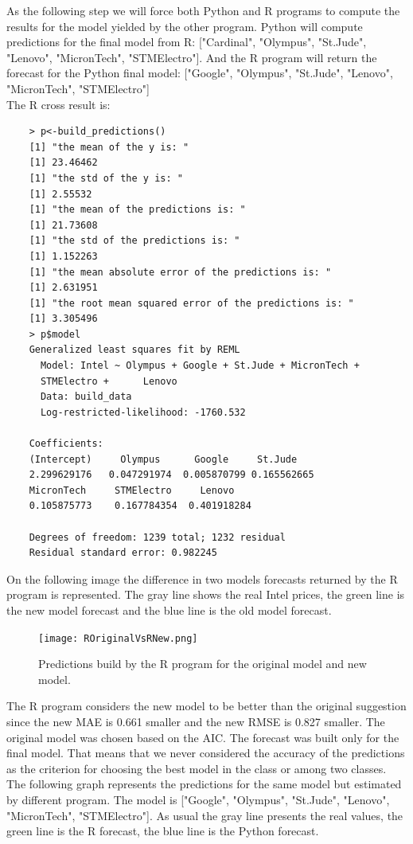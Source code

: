 \documentclass[
  twoside,
  11pt, a4paper,
  footinclude=true,
  headinclude=true,
  cleardoublepage=empty
]{scrreprt}
\begin{document}
    As the following step we will force both Python and R programs to compute the results for the model yielded by the other program. Python will compute predictions for the final model from R: ["Cardinal", "Olympus", "St.Jude", "Lenovo", "MicronTech", "STMElectro"]. And the R program will return the forecast for the Python final model: ["Google", "Olympus", "St.Jude", "Lenovo", "MicronTech", "STMElectro"]\\
    The R cross result is:
    \begin{verbatim}
    > p<-build_predictions()
    [1] "the mean of the y is: "
    [1] 23.46462
    [1] "the std of the y is: "
    [1] 2.55532
    [1] "the mean of the predictions is: "
    [1] 21.73608
    [1] "the std of the predictions is: "
    [1] 1.152263
    [1] "the mean absolute error of the predictions is: "
    [1] 2.631951
    [1] "the root mean squared error of the predictions is: "
    [1] 3.305496
    > p$model
    Generalized least squares fit by REML
      Model: Intel ~ Olympus + Google + St.Jude + MicronTech + 
      STMElectro +      Lenovo 
      Data: build_data 
      Log-restricted-likelihood: -1760.532
    
    Coefficients:
    (Intercept)     Olympus      Google     St.Jude  
    2.299629176   0.047291974  0.005870799 0.165562665
    MicronTech     STMElectro     Lenovo 
    0.105875773    0.167784354  0.401918284 
    
    Degrees of freedom: 1239 total; 1232 residual
    Residual standard error: 0.982245 
    \end{verbatim}
    On the following image the difference in two models forecasts returned by the R program is represented. The gray line shows the real Intel prices, the green line is the new model forecast and the blue line is the old model forecast.
    
    \begin{figure}[H]
        \texttt{[image: ROriginalVsRNew.png]}
        \centering
        \caption{Predictions build by the R program for the original model and new model.}
        \label{fig:ROriginalVsRNew}
    \end{figure}
    
    The R program considers the new model to be better than the original suggestion since the new MAE is 0.661 smaller and the new RMSE is 0.827 smaller. The original model was chosen based on the AIC. The forecast was built only for the final model. That means that we never considered the accuracy of the predictions as the criterion for choosing the best model in the class or among two classes.\\
    The following graph represents the predictions for the same model but estimated by different program. The model is ["Google", "Olympus", "St.Jude", "Lenovo", "MicronTech", "STMElectro"]. As usual the gray line presents the real values, the green line is the R forecast, the blue line is the Python forecast.
    
\end{document}

